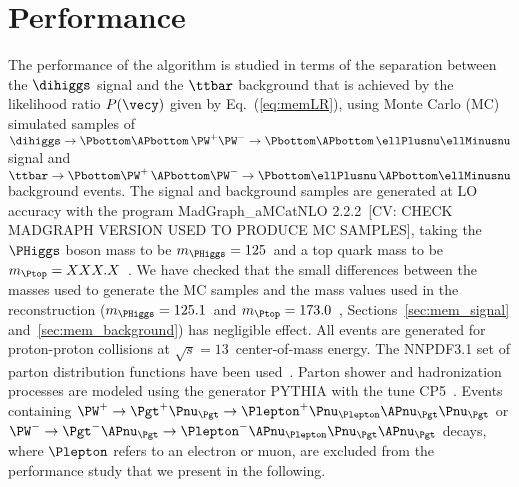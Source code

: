 \section{Performance}
\label{sec:performance}

The performance of the algorithm is studied in terms of the separation between the $\dihiggs$ signal and the $\ttbar$ background 
that is achieved by the likelihood ratio $P(\vecy)$ given by Eq.~(\ref{eq:memLR}),
using Monte Carlo (MC) simulated samples of 
$\dihiggs \to \Pbottom\APbottom \, \PW^{+}\PW^{-} \to \Pbottom\APbottom \, \ellPlusnu\ellMinusnu$ signal 
and $\ttbar \to \Pbottom\PW^{+} \, \APbottom\PW^{-} \to \Pbottom\ellPlusnu \, \APbottom\ellMinusnu$ background events.
The signal and background samples are generated at LO accuracy with the program MadGraph\_aMCatNLO 2.2.2~\cite{MadGraph_aMCatNLO}[CV: CHECK MADGRAPH VERSION USED TO PRODUCE MC SAMPLES],
taking the $\PHiggs$ boson mass to be $m_{\PHiggs} = 125$~\GeV and a top quark mass to be $m_{\Ptop} = XXX.X$~.
We have checked that the small differences between the masses used to generate the MC samples
and the mass values used in the reconstruction ($m_{\PHiggs} = 125.1$~\GeV and $m_{\Ptop} = 173.0$~\GeV, \cf Sections~\ref{sec:mem_signal} and~\ref{sec:mem_background})
has negligible effect.
All events are generated for proton-proton collisions at $\sqrt{s} = 13$~\TeV center-of-mass energy.
The NNPDF3.1 set of parton distribution functions have been used~\cite{NNPDF1,NNPDF2,NNPDF3}.
Parton shower and hadronization processes are modeled using the generator PYTHIA with the tune CP5~\cite{PYTHIA_CP5tune_CMS}.
Events containing $\PW^{+} \to \Pgt^{+}\Pnu_{\Pgt} \to \Plepton^{+}\Pnu_{\Plepton}\APnu_{\Pgt}\Pnu_{\Pgt}$ 
or $\PW^{-} \to \Pgt^{-}\APnu_{\Pgt} \to \Plepton^{-}\APnu_{\Plepton}\Pnu_{\Pgt}\APnu_{\Pgt}$ decays,
where $\Plepton$ refers to an electron or muon, are excluded from the performance study that we present in the following.


